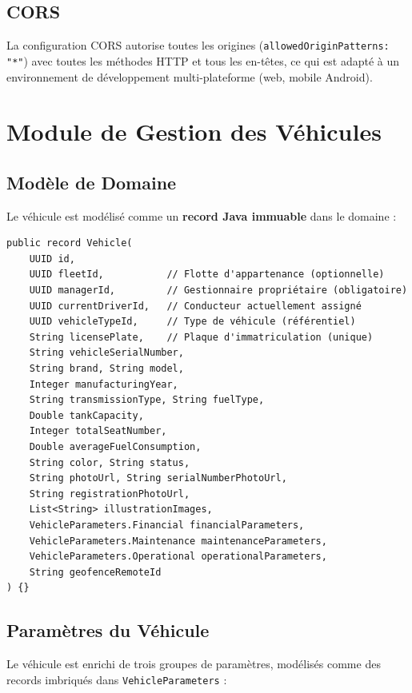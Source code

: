 \documentclass[12pt,a4paper]{report}
\begin{document}
\subsection{CORS}

La configuration CORS autorise toutes les origines (\texttt{allowedOriginPatterns: "*"}) avec toutes les méthodes HTTP et tous les en-têtes, ce qui est adapté à un environnement de développement multi-plateforme (web, mobile Android).

\section{Module de Gestion des Véhicules}

\subsection{Modèle de Domaine}

Le véhicule est modélisé comme un \textbf{record Java immuable} dans le domaine :

\begin{lstlisting}[style=javaStyle, caption={Modèle de domaine Vehicle}]
public record Vehicle(
    UUID id,
    UUID fleetId,           // Flotte d'appartenance (optionnelle)
    UUID managerId,         // Gestionnaire propriétaire (obligatoire)
    UUID currentDriverId,   // Conducteur actuellement assigné
    UUID vehicleTypeId,     // Type de véhicule (référentiel)
    String licensePlate,    // Plaque d'immatriculation (unique)
    String vehicleSerialNumber,
    String brand, String model,
    Integer manufacturingYear,
    String transmissionType, String fuelType,
    Double tankCapacity,
    Integer totalSeatNumber,
    Double averageFuelConsumption,
    String color, String status,
    String photoUrl, String serialNumberPhotoUrl,
    String registrationPhotoUrl,
    List<String> illustrationImages,
    VehicleParameters.Financial financialParameters,
    VehicleParameters.Maintenance maintenanceParameters,
    VehicleParameters.Operational operationalParameters,
    String geofenceRemoteId
) {}
\end{lstlisting}

\subsection{Paramètres du Véhicule}

Le véhicule est enrichi de trois groupes de paramètres, modélisés comme des records imbriqués dans \texttt{VehicleParameters} :
\end{document}
